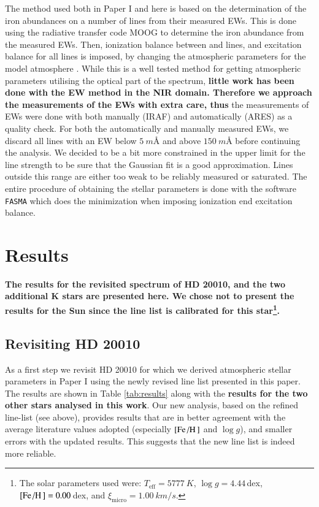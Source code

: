 \documentclass{aa}
\begin{document}
The method used both in Paper I and here is based on the determination of the iron abundances on a
number of lines from their measured EWs. This is done using the radiative transfer code MOOG
\citep{Sneden1973} to determine the iron abundance from the measured EWs. Then, ionization balance
between  and  lines, and excitation balance for all  lines is
imposed, by changing the atmospheric parameters for the model atmosphere \citep[][ATLAS9 is used
here]{Kurucz1993}. While this is a well tested method for getting atmospheric parameters utilising
the optical part of the spectrum, {\bf little work has been done with the EW method in the NIR
domain. Therefore we approach the measurements of the EWs with extra care, thus} the measurements of
EWs were done with both manually (IRAF) and automatically (ARES) as a quality check. For both the
automatically and manually measured EWs, we discard all lines with an EW below $\SI{5}{m}$\AA{} and
above $\SI{150}{m}$\AA{} before continuing the analysis. We decided to be a bit more constrained in
the upper limit for the line strength to be sure that the Gaussian fit is a good approximation.
Lines outside this range are either too weak to be reliably measured or saturated. The entire
procedure of obtaining the stellar parameters is done with the software \texttt{FASMA}
\citep{Andreasen2017a} which does the minimization when imposing ionization end excitation balance.




\section{Results}
\label{sec:results}

{\bf The results for the revisited spectrum of HD 20010, and the two additional K stars are
presented here. We chose not to present the results for the Sun since the line list is calibrated
for this star\footnote{The solar parameters used were: $T_\mathrm{eff}=\SI{5777}{K}$, $\log
g=4.44\,$dex, $[\ion{Fe}/\ion{H}]=0.00\,$dex, and $\xi_\mathrm{micro}=\SI{1.00}{km/s}$.}.}

\subsection{Revisiting HD 20010}
\label{sec:hd20010}

As a first step we revisit HD 20010 for which we derived atmospheric stellar parameters in Paper I
using the newly revised line list presented in this paper. The results are shown in Table
\ref{tab:results} along with the {\bf results for the two other stars analysed in this work}. Our
new analysis, based on the refined line-list (see above), provides results that are in better
agreement with the average literature values adopted (especially $[\ion{Fe}/\ion{H}]$ and $\log g$),
and smaller errors with the updated results. This suggests that the new line list is indeed more
reliable.
\end{document}
